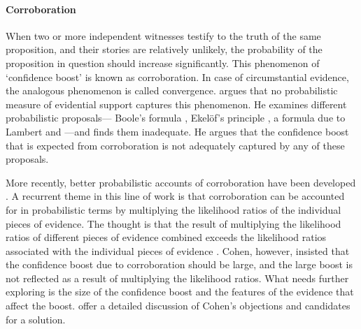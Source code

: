 \documentclass{article}
\begin{document}
\paragraph{Corroboration} When two or more independent witnesses testify to the truth of the same proposition, and their stories are relatively unlikely, the probability of the proposition in question should increase significantly. This phenomenon of `confidence boost' is known as corroboration.  In case of circumstantial evidence, the analogous phenomenon is called convergence. \cite{Cohen1977The-probable-an} argues  that  no probabilistic measure of evidential support captures this  phenomenon. He examines different probabilistic proposals---
Boole's formula \citep{Boole1857}, Ekel\"of's principle \citep{ekelof1964free}, a formula due to Lambert and \citet{kruskal1988MiraclesStatisticsCasual}---and finds them inadequate.  
He argues that the  confidence boost that is expected from corroboration is not adequately captured by any of these proposals. 

More recently, better probabilistic 
accounts of corroboration have been developed \citep{taroni2006bayesian,robertson2016interpreting,Fenton2018Risk}. A recurrent theme in this line of work is  that corroboration can be accounted for in probabilistic terms by multiplying the likelihood ratios of the individual pieces of evidence. %
The thought is that the result of multiplying the likelihood ratios of different pieces of evidence combined %
 exceeds the  likelihood ratios associated with the individual pieces of evidence \citep[see general discussion in][chp.\ 5]{bovens2004bayesian}.
 Cohen, however, insisted that the  confidence boost due to corroboration should be large, and the large boost is not reflected 
as  a result of multiplying the likelihood ratios.
What needs further exploring is  the size of the confidence boost and the features of the evidence that affect the boost.
\cite{urbaniak2019ProbabilisticModelsLegal} offer a detailed discussion of Cohen's objections and candidates for a solution. %
\end{document}
